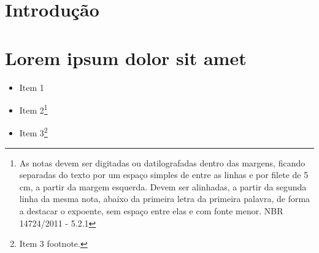 \documentclass[12pt,twoside,openright,a4paper]{abntex2}
\begin{document}
\listoffigures

\listoftables



\tableofcontents




\chapter{Introdução}

\lipsum[1-2]


\chapter{Lorem ipsum dolor sit amet}

\lipsum[3]

\begin{itemize}
  \item Item 1
  \item Item 2\footnote{As notas devem ser digitadas ou datilografadas dentro
  das margens, ficando separadas do texto por um espaço simples de entre as
  linhas e por filete de 5 cm, a partir da margem esquerda. Devem ser
  alinhadas, a partir da segunda linha da mesma nota, abaixo da primeira letra
  da primeira palavra, de forma a destacar o expoente, sem espaço entre elas e
  com fonte menor. NBR 14724/2011 - 5.2.1}
  \item Item 3\footnote{Item 3 footnote.}
\end{itemize}


\lipsum[4]
\end{document}
